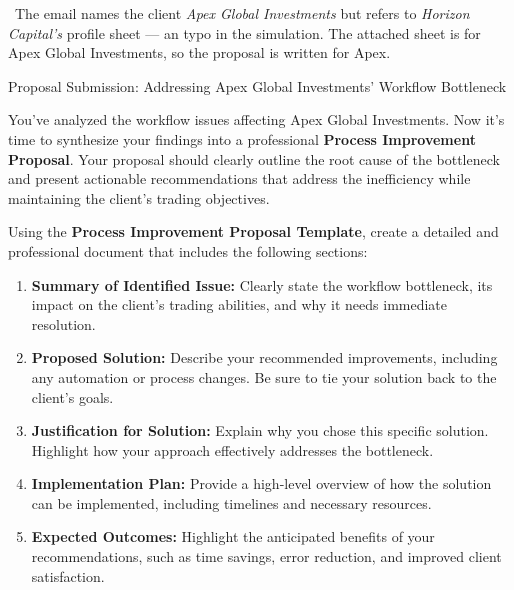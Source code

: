 \documentclass[11pt]{article}
\begin{document}

{\small\color{gray}\faInfoCircle\ The email names the client \emph{Apex Global
Investments} but refers to \emph{Horizon Capital's} profile sheet --- an
typo in the simulation. The attached sheet is for Apex Global Investments,
so the proposal is written for Apex.\par}

\newpage
{\fontsize{26}{30}\selectfont Proposal Submission: Addressing Apex Global Investments' Workflow Bottleneck}\par\bigskip

You've analyzed the workflow issues affecting Apex Global Investments. Now it's
time to synthesize your findings into a professional \textbf{Process
Improvement Proposal}. Your proposal should clearly outline the root cause of
the bottleneck and present actionable recommendations that address the
inefficiency while maintaining the client's trading objectives.

Using the \textbf{Process Improvement Proposal Template}, create a detailed and
professional document that includes the following sections:
\begin{enumerate}[leftmargin=1.5em, itemsep=3pt]
  \item \textbf{Summary of Identified Issue:} Clearly state the workflow
  bottleneck, its impact on the client's trading abilities, and why it needs
  immediate resolution.
  \item \textbf{Proposed Solution:} Describe your recommended improvements,
  including any automation or process changes. Be sure to tie your solution
  back to the client's goals.
  \item \textbf{Justification for Solution:} Explain why you chose this
  specific solution. Highlight how your approach effectively addresses the
  bottleneck.
  \item \textbf{Implementation Plan:} Provide a high-level overview of how the
  solution can be implemented, including timelines and necessary resources.
  \item \textbf{Expected Outcomes:} Highlight the anticipated benefits of your
  recommendations, such as time savings, error reduction, and improved client
  satisfaction.
\end{enumerate}
\end{document}
